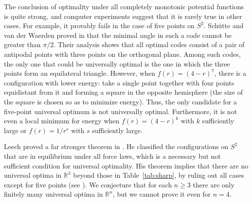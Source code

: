 \documentclass{jams-l}
\theoremstyle{plain}
\numberwithin{theorem}{section}
\theoremstyle{definition}
\numberwithin{equation}{section}
\newcommand{\R}{{\mathbb R}}
\begin{document}
The conclusion of optimality under all completely monotonic
potential functions is quite strong, and computer experiments
suggest that it is rarely true in other cases.  For example, it
provably fails in the case of five points on $S^2$.  Sch\"utte and
van der Waerden proved in \cite{SW} that the minimal angle in such
a code cannot be greater than $\pi/2$. Their analysis shows that
all optimal codes consist of a pair of antipodal points with three
points on the orthogonal plane.  Among such codes, the only one
that could be universally optimal is the one in which the three
points form an equilateral triangle. However, when $f(r) =
(4-r)^7$, there is a configuration with lower energy: take a single
point together with four points equidistant from it and forming a
square in the opposite hemisphere (the size of the square is
chosen so as to minimize energy).  Thus, the only candidate for a
five-point universal optimum is not universally optimal.
Furthermore, it is not even a local minimum for energy when $f(r)
= (4-r)^k$ with $k$ sufficiently large or $f(r) = 1/r^s$ with $s$
sufficiently large.

Leech proved a far stronger theorem in \cite{Leech}.  He
classified the configurations on $S^2$ that are in equilibrium
under all force laws, which is a necessary but not sufficient
condition for universal optimality.  His theorem implies that
there are no universal optima in $\R^3$ beyond those in
Table~\ref{tab:sharp}, by ruling out all cases except for five
points (see \cite[p.~89]{Leech}). We conjecture that for each $n
\ge 3$ there are only finitely many universal optima in $\R^n$,
but we cannot prove it even for $n=4$.
\end{document}
